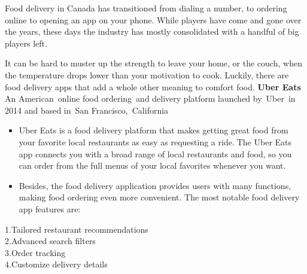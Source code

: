 \documentclass[12pt]{article}
\begin{document}
Food delivery in Canada has transitioned from dialing a number, to ordering online to opening an app on your phone. While players have come and gone over the years, these days the industry has mostly consolidated with a handful of big players left.

It can be hard to muster up the strength to leave your home, or the couch, when the temperature drops lower than your motivation to cook. Luckily, there are food delivery apps that add a whole other meaning to comfort food.
\textbf{Uber Eats
}
An American online food ordering and delivery platform launched by Uber in 2014 and based in San Francisco, California
\begin{itemize}
\item Uber Eats is a food delivery platform that makes getting great food from your favorite local restaurants as easy as requesting a ride.The Uber Eats app connects you with a broad range of local restaurants and food, so you can order from the full menus of your local favorites whenever you want.
\end{itemize}
\begin{itemize}
\item Besides, the food delivery application provides users with many functions, making food ordering even more convenient. The most notable food delivery app features are:			
\end{itemize}
			1.Tailored restaurant recommendations\\
			2.Advanced search filters\\
			3.Order tracking\\
			4.Customize delivery details
\end{document}
